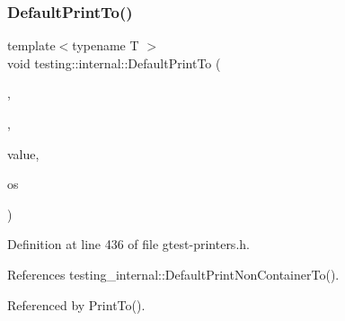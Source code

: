 \subsubsection{\texorpdfstring{Default\+Print\+To()}{DefaultPrintTo()}\hspace{0.1cm}{\footnotesize\ttfamily [3/3]}}
{\footnotesize\ttfamily template$<$typename T $>$ \\
void testing\+::internal\+::\+Default\+Print\+To (\begin{DoxyParamCaption}\item[{\hyperlink{namespacetesting_1_1internal_abf080521ce135deb510e0a7830fd3d33}{Is\+Not\+Container}}]{,  }\item[{\hyperlink{namespacetesting_1_1internal_abb1d0789f19bdde21affccbd1078b525}{false\+\_\+type}}]{,  }\item[{const T \&}]{value,  }\item[{\+::std\+::ostream $\ast$}]{os }\end{DoxyParamCaption})}



Definition at line 436 of file gtest-\/printers.\+h.



References testing\+\_\+internal\+::\+Default\+Print\+Non\+Container\+To().



Referenced by Print\+To().


